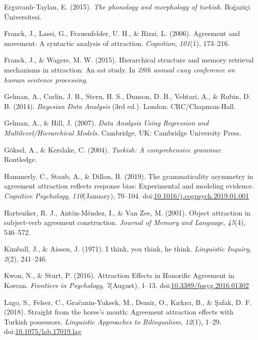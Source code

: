 \documentclass[doc]{apa6}
\begin{document}
\leavevmode\hypertarget{ref-Taylan2015}{}%
Erguvanlı-Taylan, E. (2015). \emph{The phonology and morphology of turkish}. Boğaziçi Üniversitesi.

\leavevmode\hypertarget{ref-Franck2006}{}%
Franck, J., Lassi, G., Frauenfelder, U. H., \& Rizzi, L. (2006). Agreement and movement: A syntactic analysis of attraction. \emph{Cognition}, \emph{101}(1), 173--216.

\leavevmode\hypertarget{ref-Franck2015}{}%
Franck, J., \& Wagers, M. W. (2015). Hierarchical structure and memory retrieval mechanisms in attraction: An sat study. In \emph{28th annual cuny conference on human sentence processing}.

\leavevmode\hypertarget{ref-BDA3}{}%
Gelman, A., Carlin, J. B., Stern, H. S., Dunson, D. B., Vehtari, A., \& Rubin, D. B. (2014). \emph{Bayesian Data Analysis} (3rd ed.). London: CRC/Chapman-Hall.

\leavevmode\hypertarget{ref-GelmanHill:2007}{}%
Gelman, A., \& Hill, J. (2007). \emph{Data Analysis Using Regression and Multilevel/Hierarchical Models}. Cambridge, UK: Cambridge University Press.

\leavevmode\hypertarget{ref-Goksel2004}{}%
Göksel, A., \& Kerslake, C. (2004). \emph{Turkish: A comprehensive grammar}. Routledge.

\leavevmode\hypertarget{ref-HammerlyEtAl:2019}{}%
Hammerly, C., Staub, A., \& Dillon, B. (2019). The grammaticality asymmetry in agreement attraction reflects response bias: Experimental and modeling evidence. \emph{Cognitive Psychology}, \emph{110}(January), 70--104. doi:\href{https://doi.org/10.1016/j.cogpsych.2019.01.001}{10.1016/j.cogpsych.2019.01.001}

\leavevmode\hypertarget{ref-Hartsuiker2001}{}%
Hartsuiker, R. J., Antón-Méndez, I., \& Van Zee, M. (2001). Object attraction in subject-verb agreement construction. \emph{Journal of Memory and Language}, \emph{45}(4), 546--572.

\leavevmode\hypertarget{ref-Kimball1971}{}%
Kimball, J., \& Aissen, J. (1971). I think, you think, he think. \emph{Linguistic Inquiry}, \emph{2}(2), 241--246.

\leavevmode\hypertarget{ref-KwonSturt:2016}{}%
Kwon, N., \& Sturt, P. (2016). Attraction Effects in Honorific Agreement in Korean. \emph{Frontiers in Psychology}, \emph{7}(August), 1--13. doi:\href{https://doi.org/10.3389/fpsyg.2016.01302}{10.3389/fpsyg.2016.01302}

\leavevmode\hypertarget{ref-LagoEtAl:2018}{}%
Lago, S., Felser, C., Gračanin-Yuksek, M., Demir, O., Kırkıcı, B., \& Şafak, D. F. (2018). Straight from the horse's mouth: Agreement attraction effects with Turkish possessors. \emph{Linguistic Approaches to Bilingualism}, \emph{12}(1), 1--29. doi:\href{https://doi.org/10.1075/lab.17019.lag}{10.1075/lab.17019.lag}
\end{document}
